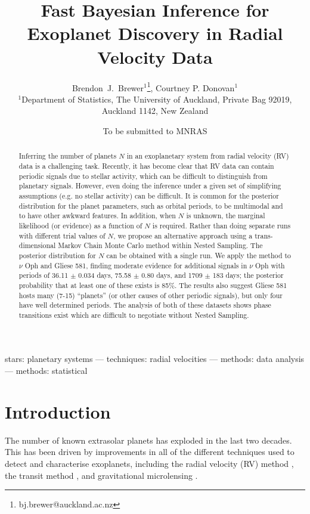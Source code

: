 \documentclass[useAMS,usenatbib]{mn2e}
\title[]
{Fast Bayesian Inference for Exoplanet Discovery in Radial Velocity Data}
\author[Brewer and Donovan]{%
  Brendon~J.~Brewer$^{1}$\thanks{bj.brewer@auckland.ac.nz},
  Courtney P. Donovan$^{1}$
  \medskip\\
  $^1$Department of Statistics, The University of Auckland, Private Bag 92019, Auckland 1142, New Zealand}
\begin{document}
             
\date{To be submitted to MNRAS}
             
\maketitle

\label{firstpage}


\begin{abstract}
Inferring the number of planets $N$ in an exoplanetary system from radial velocity
(RV) data is a challenging task. Recently, it has become clear that RV data
can contain periodic signals due to stellar activity, which can be difficult
to distinguish from planetary signals. However, even doing the inference
under a given set of simplifying assumptions (e.g. no stellar activity) can
be difficult. It is common for the posterior distribution for the
planet parameters, such as orbital periods,
to be multimodal and to have other awkward features. In
addition, when $N$ is unknown, the marginal likelihood (or evidence) as a
function of $N$ is required. Rather than doing separate runs with different
trial values of $N$, we propose an alternative
approach using a trans-dimensional Markov Chain Monte Carlo method within
Nested Sampling. The posterior distribution for $N$ can be obtained with a
single run. We apply the method to $\nu$ Oph and Gliese 581, finding moderate evidence
for additional signals in
$\nu$ Oph with periods of 36.11 $\pm$ 0.034 days,
75.58 $\pm$ 0.80 days, and 1709 $\pm$ 183 days;
the posterior probability that at least one of these
exists is 85\%. The results also suggest Gliese 581 hosts many (7-15) ``planets''
(or other causes of other periodic
signals), but only four have well determined periods. The analysis of both
of these datasets shows phase transitions exist which are difficult to
negotiate without Nested Sampling.
\end{abstract}

\begin{keywords}
stars: planetary systems --- techniques: radial velocities ---
methods: data analysis --- methods: statistical
\end{keywords}


\section{Introduction}
The number of known extrasolar planets has exploded in the last two
decades. This has been driven by improvements in
all of the different techniques used to detect and characterise exoplanets,
including the radial velocity (RV) method \citep[e.g.][]{2012PASJ...64..135S},
the transit method \citep[e.g.][]{2014PNAS..11112647B},
and gravitational microlensing
\citep[e.g.][]{2014ApJ...785..155B, 2014ApJ...790...14Y}.
\end{document}
